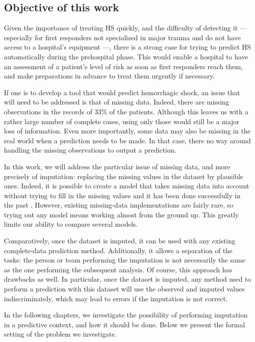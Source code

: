 		\subsection{Objective of this work}
Given the importance of treating HS quickly, and the difficulty of detecting it --- especially for first responders not specialized in major trauma and do not have access to a hospital's equipment ---, there is a strong case for trying to predict HS automatically during the prehospital phase. This would enable a hospital to have an assessment of a patient's level of risk as soon as first responders reach them, and make preparations in advance to treat them urgently if necessary.
		
If one is to develop a tool that would predict hemorrhagic shock, an issue that will need to be addressed is that of missing data. Indeed, there are missing observations in the records of 33\% of the patients. Although this leaves us with a rather large number of complete cases, using only those would still be a major loss of information. Even more importantly, some data may also be missing in the real world when a prediction needs to be made. In that case, there no way around handling the missing observations to output a prediction.

In this work, we will address the particular issue of missing data, and more precisely of imputation: replacing the missing values in the dataset by plausible ones. Indeed, it is possible to create a model that takes missing data into account without trying to fill in the missing values and it has been done successfully in the past \cite{schafer2002missing}. However, existing missing-data implementations are fairly rare, so trying out any model means working almost from the ground up. This greatly limits our ability to compare several models.

Comparatively, once the dataset is imputed, it can be used with any existing complete-data prediction method. Additionally, it allows a separation of the tasks: the person or team performing the imputation is not necessarily the same as the one performing the subsequent analysis. Of course, this approach has drawbacks as well. In particular, once the dataset is imputed, any method used to perform a prediction with this dataset will use the observed and imputed values indiscriminately, which may lead to errors if the imputation is not correct.

 In the following chapters, we investigate the possibility of performing imputation in a predictive context, and how it should be done. Below we present the formal setting of the problem we investigate.
 
